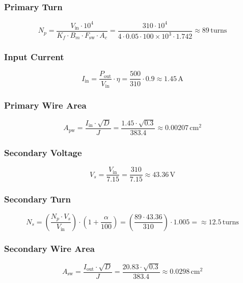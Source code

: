 \subsubsection*{Primary Turn}
\begin{equation}
    N_p = \frac{V_{\text{in}} \cdot 10^4}{K_f \cdot B_m \cdot F_{\text{sw}} \cdot A_c} = \frac{310 \cdot 10^4}{4 \cdot 0.05 \cdot 100 \times 10^3 \cdot 1.742} \approx \boxed{89\,\text{turns}} 
\end{equation}

\subsubsection*{Input Current}
\begin{equation}
    I_{\text{in}} = \frac{P_{\text{out}}}{V_{\text{in}}} \cdot \eta = \frac{500}{310} \cdot 0.9 \approx \boxed{1.45\,\text{A}}
\end{equation}

\subsubsection*{Primary Wire Area}
\begin{equation}
    A_{\text{pw}} = \frac{I_{\text{in}} \cdot \sqrt{D}}{J} = \frac{1.45 \cdot \sqrt{0.3}}{383.4} \approx \boxed{0.00207\,\text{cm}^2}
\end{equation}

\subsubsection*{Secondary Voltage}
\begin{equation}
    V_s = \frac{V_{\text{in}}}{7.15} = \frac{310}{7.15} \approx \boxed{43.36\,\text{V}}
\end{equation}

\subsubsection*{Secondary Turn}
\begin{equation}
    N_s = \left( \frac{N_p \cdot V_s}{V_{\text{in}}} \right) \cdot \left( 1 + \frac{\alpha}{100} \right) = \left( \frac{89 \cdot 43.36}{310} \right) \cdot 1.005 = \approx \boxed{12.5\,\text{turns}}
\end{equation}

\subsubsection*{Secondary Wire Area}
\begin{equation}
A_{\text{sw}} = \frac{I_{\text{out}} \cdot \sqrt{D}}{J} 
= \frac{20.83 \cdot \sqrt{0.3}}{383.4}
\approx \boxed{0.0298\,\text{cm}^2}
\end{equation}

